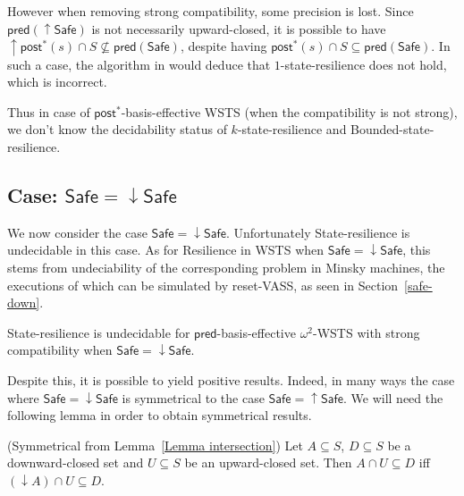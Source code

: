\documentclass[runningheads]{llncs}
\newcommand{\alain}[1]{\todo[inline,color=red!20]{{\bf AF:} #1}}
\newcommand{\pred}{\textsf{pred}}
\newcommand{\post}{\textsf{post}}
\newcommand{\Safe}{\textsf{Safe}}
\begin{document}
However when removing strong compatibility, some precision is lost.
Since $\pred(\mathop{\uparrow} \Safe)$ is not necessarily upward-closed, it is possible to have 
 $\mathop{\uparrow} \post^* (s) \cap S \not\subseteq \pred(\Safe)$,
despite having 
$\post^* (s) \cap S \subseteq \pred( \Safe)$.
In such a case, the algorithm in
\cite{DBLP:conf/gg/Ozkan22} would deduce that {\sc $1$-state-resilience} does not hold,
which is incorrect.

Thus in case of $\post^*$-basis-effective WSTS (when the compatibility is not strong), we don't know the decidability status of {\sc $k$-state-resilience} and 
{\sc Bounded-state-resilience}. 





\subsection{Case: $\Safe = \mathop{\downarrow} \Safe$}


We now consider the case $\Safe = \mathop{\downarrow} \Safe$.
%
Unfortunately {\sc State-resilience} is undecidable in this case. As for {\sc Resilience} in WSTS when $\Safe = \mathop{\downarrow} \Safe$, this stems from undeciability of the corresponding problem in Minsky machines, the executions of which can be simulated by reset-VASS, as seen in 
Section~\ref{safe-down}.\alain{trop rapide}

\begin{proposition}\label{srp down up}
{\sc State-resilience} is undecidable for 
 $\pred$-basis-effective $\omega^2$-WSTS with strong compatibility
when
$\Safe=\mathop{\downarrow} \Safe$.
\end{proposition}



Despite this, it is possible to yield positive results. Indeed, in many ways the case where $\Safe = \mathop{\downarrow} \Safe$
is symmetrical to the case $\Safe = \mathop{\uparrow} \Safe$.
%
We will need the following lemma in order to obtain symmetrical results.

\begin{lemma}(Symmetrical from Lemma~\ref{Lemma intersection})\label{Lemma intersection 2}
Let $A \subseteq S$, $D \subseteq S$ be a downward-closed set and $U \subseteq S$ be an upward-closed set. 
Then $A \cap U \subseteq D$  iff $ (\mathop{\downarrow}  A) \cap U \subseteq D$.
\end{lemma}
\end{document}
